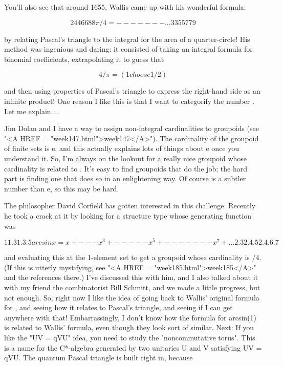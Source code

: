 You'll also see that around 1655, Wallis came up with his wonderful
formula:

$$
       2 4 4 6 6 8 8 
\pi /4 = - - - - - - - ...
       3 3 5 5 7 7 9 
$$
    
by relating Pascal's triangle to the integral for the area of a 
quarter-circle!  His method was ingenious and daring: it consisted
of taking an integral formula for binomial coefficients, extrapolating 
it to guess that

$$
4/\pi  = (1 choose 1/2)
$$
    
and then using properties of Pascal's triangle to express the right-hand
side as an infinite product!  One reason I like this is that I want
to categorify the number \pi .  Let me explain....

Jim Dolan and I have a way to assign non-integral cardinalities to
groupoids (see "<A HREF = "week147.html">week147</A>").  The
cardinality of the groupoid of finite sets is e, and this actually
explains lots of things about e once you understand it.  So, I'm always
on the lookout for a really nice groupoid whose cardinality is related
to \pi .  It's easy to find groupoids that do the job; the hard part is
finding one that does so in an enlightening way.  Of course \pi  is a
subtler number than e, so this may be hard.

The philosopher David Corfield has gotten interested in this challenge.
Recently he took a crack at it by looking for a structure type whose
generating function was 
 
$$
                  1          1.3          1.3.5
arcsin x =  x +  --- x^{3}  +  -----  x^{5} +  -------  x^{7} + ...
                 2.3        2.4.5        2.4.6.7
$$
    
and evaluating this at the 1-element set to get a groupoid whose
cardinality is \pi /4.  (If this is utterly mystifying, see "<A HREF = "week185.html">week185</A>" 
and the references there.)  I've discussed this with him, and I also talked 
about it with my friend the combinatorist Bill Schmitt, and we made 
a little progress, but not enough.  So, right now I like the idea
of going back to Wallis' original formula for \pi , and seeing how
it relates to Pascal's triangle, and seeing if I can get anywhere
with that!  
Embarrassingly, I don't know how the formula for arcsin(1)
is related to Wallis' formula, even though they look sort of similar.
Next:
If you like the "UV = qVU" idea, you need to study the "noncommutative
torus".  This is a name for the C*-algebra generated by two unitaries U
and V satisfying UV = qVU.  The quantum Pascal triangle is built right
in, because

